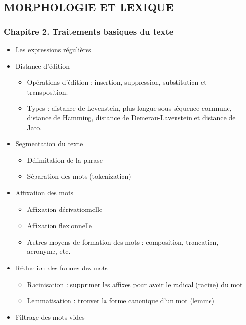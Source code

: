 \documentclass[11pt, a4paper]{article}
\begin{document}
\subsection*{\uppercase{Morphologie et lexique}}

\begin{tcolorbox}
\subsubsection*{Chapitre 2. Traitements basiques du texte}

\begin{multicols}{2}
\begin{itemize}
	
	\item Les expressions régulières 

	\item Distance d'édition 
	\begin{itemize}
		\item Opérations d'édition : insertion, suppression, substitution et transposition. 
		\item Types : distance de Levenstein, plus longue sous-séquence commune, distance de Hamming, distance de Demerau-Lavenstein et distance de Jaro.
	\end{itemize}

	\item Segmentation du texte 
	\begin{itemize}
		\item Délimitation de la phrase  
		\item Séparation des mots (tokenization)
	\end{itemize}

	\item Affixation des mots
	\begin{itemize}
		\item Affixation dérivationnelle
		\item Affixation flexionnelle 
		\item Autres moyens de formation des mots : composition, troncation, acronyme, etc.
	\end{itemize}

	\item Réduction des formes des mots
	\begin{itemize}
		\item Racinisation : supprimer les affixes pour avoir le radical (racine) du mot
		\item Lemmatisation : trouver la forme canonique d'un mot (lemme)
	\end{itemize}

	\item Filtrage des mots vides

\end{itemize}
\end{multicols}
\end{tcolorbox}
\end{document}
